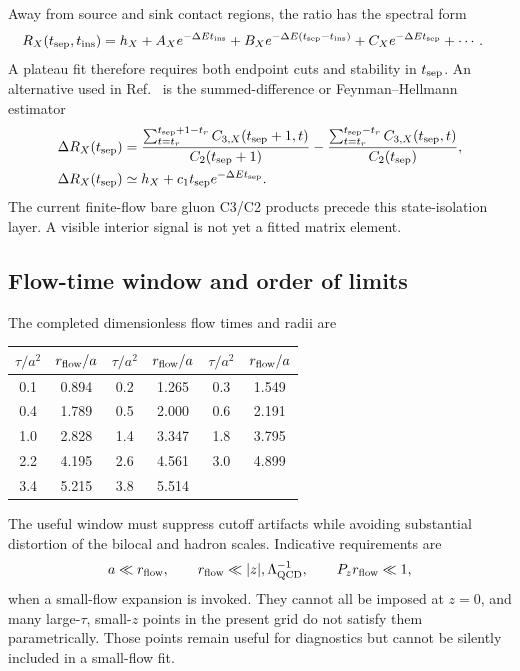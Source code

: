 \documentclass[11pt]{article}
\numberwithin{equation}{section}
\begin{document}
Away from source and sink contact regions, the ratio has the spectral form
\begin{align}
 R_X(t_{\rm sep},t_{\rm ins})={}&h_X
 +A_Xe^{-\Delta E t_{\rm ins}}
 +B_Xe^{-\Delta E(t_{\rm sep}-t_{\rm ins})}
 +C_Xe^{-\Delta E t_{\rm sep}}+\cdots .
 \label{eq:gluon-ratio-spectral}
\end{align}
A plateau fit therefore requires both endpoint cuts and stability in
\(t_{\rm sep}\).  An alternative used in
Ref.~\cite{ChenEtAl2025GluonPDF} is the summed-difference or
Feynman--Hellmann estimator
\begin{align}
 \Delta R_X(t_{\rm sep})={}&
 \frac{\sum_{t=t_r}^{t_{\rm sep}+1-t_r}
 C_{3,X}(t_{\rm sep}+1,t)}{C_2(t_{\rm sep}+1)}
 -\frac{\sum_{t=t_r}^{t_{\rm sep}-t_r}
 C_{3,X}(t_{\rm sep},t)}{C_2(t_{\rm sep})},
 \label{eq:gluon-fh-ratio}\\
 \Delta R_X(t_{\rm sep})\simeq{}&h_X+c_1t_{\rm sep}
 e^{-\Delta E t_{\rm sep}}.
 \label{eq:gluon-fh-fit}
\end{align}
The current finite-flow bare gluon C3/C2 products precede this state-isolation layer.  A visible
interior signal is not yet a fitted matrix element.

\subsection{Flow-time window and order of limits}

The completed dimensionless flow times and radii are
\begin{center}
\small
\begin{tabular}{c@{\quad}c|c@{\quad}c|c@{\quad}c}
\toprule
\(\tau/a^2\)&\(r_{\rm flow}/a\)&\(\tau/a^2\)&\(r_{\rm flow}/a\)&
\(\tau/a^2\)&\(r_{\rm flow}/a\)\\
\midrule
0.1&0.894&0.2&1.265&0.3&1.549\\
0.4&1.789&0.5&2.000&0.6&2.191\\
1.0&2.828&1.4&3.347&1.8&3.795\\
2.2&4.195&2.6&4.561&3.0&4.899\\
3.4&5.215&3.8&5.514&&\\
\bottomrule
\end{tabular}
\end{center}
The useful window must suppress cutoff artifacts while avoiding substantial
distortion of the bilocal and hadron scales.  Indicative requirements are
\begin{equation}
  a\ll r_{\rm flow},
  \qquad r_{\rm flow}\ll |z|,\Lambda_{\rm QCD}^{-1},
  \qquad P_z r_{\rm flow}\ll1,
  \label{eq:gluon-small-flow-window}
\end{equation}
when a small-flow expansion is invoked.  They cannot all be imposed at
\(z=0\), and many large-\(\tau\), small-\(z\) points in the present grid do
not satisfy them parametrically.  Those points remain useful for diagnostics
but cannot be silently included in a small-flow fit.
\end{document}
